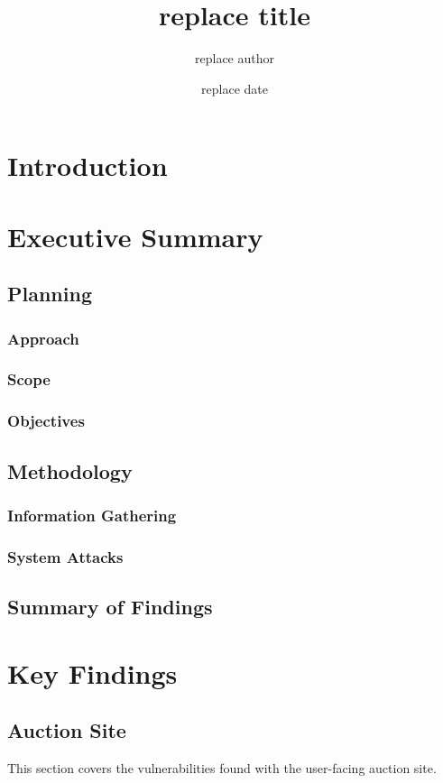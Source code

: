 \documentclass{report}
\title{replace title}
\author{replace author}
\date{replace date}
\begin{document}
\maketitle
\tableofcontents
\listoffigures

\chapter{Introduction}

\chapter{Executive Summary}
\section{Planning}
\subsection{Approach}
\subsection{Scope}
\subsection{Objectives}
\section{Methodology}
\subsection{Information Gathering}
\subsection{System Attacks}
\section{Summary of Findings}

\chapter{Key Findings}
\section{Auction Site}
This section covers the vulnerabilities found with the user-facing auction site.
\end{document}
